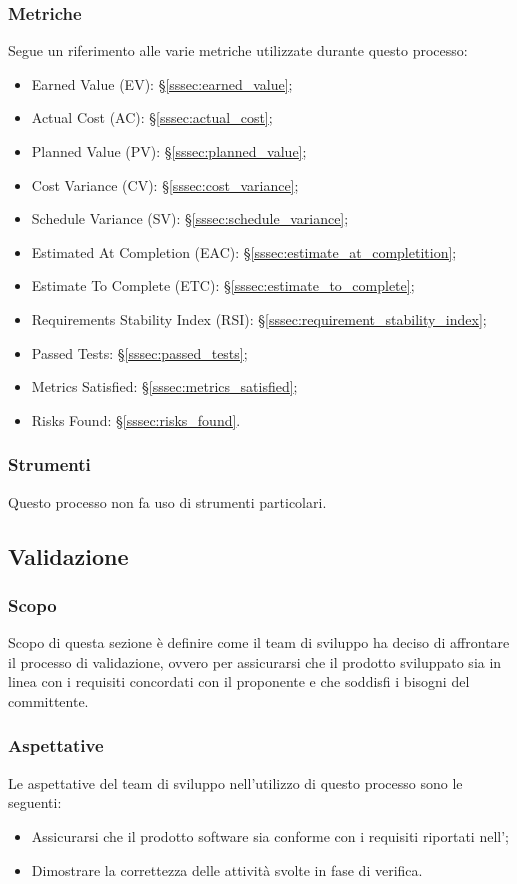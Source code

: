 \subsubsection{Metriche}
Segue un riferimento alle varie metriche utilizzate durante questo processo:
\begin{itemize}
    \item Earned Value (EV): §\ref{sssec:earned_value};
    \item Actual Cost (AC): §\ref{sssec:actual_cost};
    \item Planned Value (PV): §\ref{sssec:planned_value};
    \item Cost Variance (CV): §\ref{sssec:cost_variance};
    \item Schedule Variance (SV): §\ref{sssec:schedule_variance};
    \item Estimated At Completion (EAC): §\ref{sssec:estimate_at_completition};
    \item Estimate To Complete (ETC): §\ref{sssec:estimate_to_complete};
    \item Requirements Stability Index (RSI): §\ref{sssec:requirement_stability_index};
    \item Passed Tests: §\ref{sssec:passed_tests};
    \item Metrics Satisfied: §\ref{sssec:metrics_satisfied};
    \item Risks Found: §\ref{sssec:risks_found}.
\end{itemize}   
\subsubsection{Strumenti}
Questo processo non fa uso di strumenti particolari.
\pagebreak

\subsection{Validazione}\label{subsection: validazione}
\subsubsection{Scopo}
Scopo di questa sezione è definire come il team di sviluppo ha deciso di affrontare il processo di validazione, ovvero per assicurarsi che il prodotto sviluppato sia in linea con i requisiti concordati con il proponente e che soddisfi i bisogni del committente.
\subsubsection{Aspettative}
Le aspettative del team di sviluppo nell'utilizzo di questo processo sono le seguenti:
\begin{itemize}
    \item Assicurarsi che il prodotto software sia conforme con i requisiti riportati nell'\docNameAdRLow;
    \item  Dimostrare la correttezza delle attività svolte in fase di verifica.
\end{itemize}
